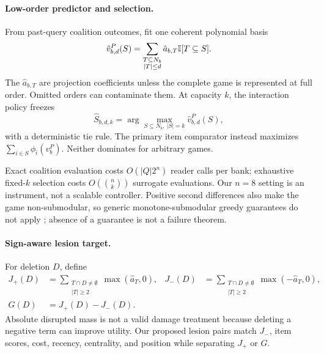 \paragraph{Low-order predictor and selection.}
From past-query coalition outcomes, fit one coherent polynomial basis
\begin{equation}
\hat v_{b,d}^{P}(S)=
\sum_{\substack{T\subseteq N_b\\|T|\le d}}\hat a_{b,T}\mathbb{I}[T\subseteq S].
\label{eq:surrogate}
\end{equation}
The \(\hat a_{b,T}\) are projection coefficients unless the complete game is
represented at full order. Omitted orders can contaminate them. At capacity \(k\),
the interaction policy freezes
\begin{equation}
\hat S_{b,d,k}=\arg\max_{S\subseteq N_b,\ |S|=k}\hat v_{b,d}^{P}(S),
\label{eq:select}
\end{equation}
with a deterministic tie rule. The primary item comparator instead maximizes
\(\sum_{i\in S}\phi_i(v_b^P)\). Neither dominates for arbitrary games.

Exact coalition evaluation costs \(O(|Q|2^n)\) reader calls per bank; exhaustive
fixed-\(k\) selection costs \(O(\binom nk)\) surrogate evaluations. Our \(n=8\)
setting is an instrument, not a scalable controller. Positive second differences
also make the game non-submodular, so generic monotone-submodular greedy guarantees
do not apply \citep{nemhauser1978}; absence of a guarantee is not a failure theorem.

\paragraph{Sign-aware lesion target.}
For deletion \(D\), define
\begin{align}
J_+(D)&=\sum_{\substack{T\cap D\ne\emptyset\\|T|\ge2}}\max(\hat a_T,0),&
J_-(D)&=\sum_{\substack{T\cap D\ne\emptyset\\|T|\ge2}}\max(-\hat a_T,0),\\
G(D)&=J_+(D)-J_-(D).
\label{eq:lesion}
\end{align}
Absolute disrupted mass is not a valid damage treatment because deleting a negative
term can improve utility. Our proposed lesion pairs match \(J_-\), item scores,
cost, recency, centrality, and position while separating \(J_+\) or \(G\).
